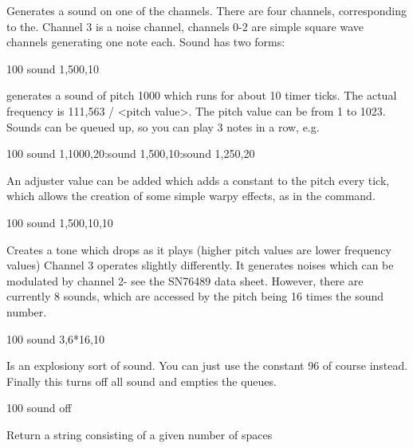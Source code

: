 \begin{entry}

Generates a sound on one of the channels. There are four channels, corresponding to the. Channel 3 is a noise channel, channels 0-2 are simple square wave channels generating one note each.
Sound has two forms:

\begin{lstexample}
100 sound 1,500,10
\end{lstexample}

generates a sound of pitch 1000 which runs for about 10 timer ticks. The actual frequency is 111,563 / <pitch value>. The pitch value can be from 1 to 1023. Sounds can be queued up, so you can play 3 notes in a row, e.g.


\begin{lstexample}
100 sound 1,1000,20:sound 1,500,10:sound 1,250,20
\end{lstexample}

An adjuster value can be added which adds a constant to the pitch every tick, which allows the creation of some simple warpy effects, as in the  command.


\begin{lstexample}
100 sound 1,500,10,10
\end{lstexample}

Creates a tone which drops as it plays (higher pitch values are lower frequency values)
Channel 3 operates slightly differently. It generates noises which can be modulated by channel 2- see the SN76489 data sheet.
However, there are currently 8 sounds, which are accessed by the pitch being 16 times the sound number.


\begin{lstexample}
100 sound 3,6*16,10
\end{lstexample}

Is an explosiony sort of sound. You can just use the constant 96 of course instead.
Finally this turns off all sound and empties the queues.


\begin{lstexample}
100 sound off
\end{lstexample}
\end{entry}

\begin{entry}
Return a string consisting of a given number of spaces


\end{entry}

